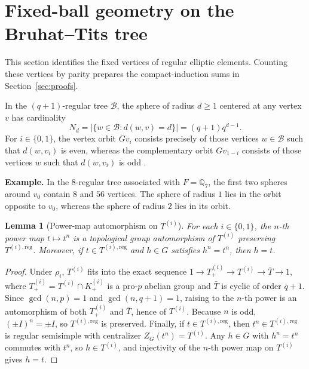 \documentclass[12pt, letterpaper]{article}
\numberwithin{equation}{section}
\newtheorem{lemma}[theorem]{Lemma}
\theoremstyle{definition}
\theoremstyle{remark}
\begin{document}
\section{Fixed-ball geometry on the Bruhat--Tits tree}\label{sec:tree}

This section identifies the fixed vertices of regular elliptic elements. Counting these vertices by parity prepares the compact-induction sums in Section~\ref{sec:proofs}.

In the $(q+1)$-regular tree $\mathscr{B}$, the sphere of radius $d\ge 1$ centered at any vertex $v$ has cardinality
\begin{equation}\label{eq:sphere-count}
 N_d=\bigl|\{w\in\mathscr{B}:d(w,v)=d\}\bigr|=(q+1)q^{d-1}.
\end{equation}
For $i\in\{0,1\}$, the vertex orbit $Gv_i$ consists precisely of those vertices $w\in\mathscr{B}$ such that $d(w,v_i)$ is even, whereas the complementary orbit $Gv_{1-i}$ consists of those vertices $w$ such that $d(w,v_i)$ is odd \cite{Ca14}.

\noindent\textbf{Example.} In the $8$-regular tree associated with $F=\mathbb{Q}_7$, the first two spheres around $v_0$ contain $8$ and $56$ vertices. The sphere of radius $1$ lies in the orbit opposite to $v_0$, whereas the sphere of radius $2$ lies in its orbit.

\begin{lemma}[Power-map automorphism on $T^{(i)}$]\label{lem:power}
For each $i\in\{0,1\}$, the $n$-th power map $t\mapsto t^n$ is a topological group automorphism of $T^{(i)}$ preserving $T^{(i),\mathrm{reg}}$. Moreover, if $t\in T^{(i),\mathrm{reg}}$ and $h\in G$ satisfies $h^n=t^n$, then $h=t$.
\end{lemma}
\begin{proof}
Under $\rho_i$, $T^{(i)}$ fits into the exact sequence $1\to T^{(i)}_+\to T^{(i)}\to\bar{T}\to 1$, where $T^{(i)}_+=T^{(i)}\cap K^{(i)}_+$ is a pro-$p$ abelian group and $\bar{T}$ is cyclic of order $q+1$. Since $\gcd(n,p)=1$ and $\gcd(n,q+1)=1$, raising to the $n$-th power is an automorphism of both $T^{(i)}_+$ and $\bar{T}$, hence of $T^{(i)}$. Because $n$ is odd, $(\pm I)^n=\pm I$, so $T^{(i),\mathrm{reg}}$ is preserved. Finally, if $t\in T^{(i),\mathrm{reg}}$, then $t^n\in T^{(i),\mathrm{reg}}$ is regular semisimple with centralizer $Z_G(t^n)=T^{(i)}$. Any $h\in G$ with $h^n=t^n$ commutes with $t^n$, so $h\in T^{(i)}$, and injectivity of the $n$-th power map on $T^{(i)}$ gives $h=t$.
\end{proof}
\end{document}
